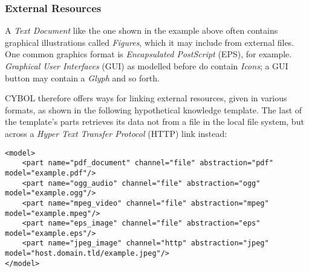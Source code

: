 %
%
%
%
%
%
%

\subsubsection{External Resources}
\label{external_resources_heading}

A \emph{Text Document} like the one shown in the example above often contains
graphical illustrations called \emph{Figures}, which it may include from
external files. One common graphics format is \emph{Encapsulated PostScript}
(EPS), for example. \emph{Graphical User Interfaces} (GUI) as modelled before
do contain \emph{Icons}; a GUI button may contain a \emph{Glyph} and so forth.

CYBOL therefore offers ways for linking external resources, given in various
formats, as shown in the following hypothetical knowledge template. The last of
the template's parts retrieves its data not from a file in the local file
system, but across a \emph{Hyper Text Transfer Protocol} (HTTP) link instead:

\begin{scriptsize}
    \begin{verbatim}
<model>
    <part name="pdf_document" channel="file" abstraction="pdf" model="example.pdf"/>
    <part name="ogg_audio" channel="file" abstraction="ogg" model="example.ogg"/>
    <part name="mpeg_video" channel="file" abstraction="mpeg" model="example.mpeg"/>
    <part name="eps_image" channel="file" abstraction="eps" model="example.eps"/>
    <part name="jpeg_image" channel="http" abstraction="jpeg" model="host.domain.tld/example.jpeg"/>
</model>
    \end{verbatim}
\end{scriptsize}
